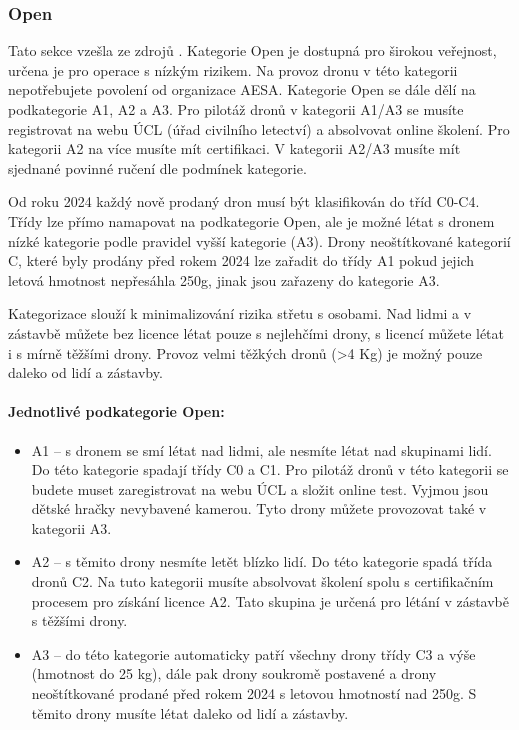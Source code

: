 \subsubsection{Open} 
Tato sekce vzešla ze zdrojů \cite{EASA:openSouhrn2024,AlzaDronyKategorie,DroneKatogorySouhrn}. Kategorie Open je dostupná pro širokou veřejnost, určena je pro operace s nízkým rizikem. Na provoz dronu v této kategorii nepotřebujete povolení od organizace AESA. Kategorie Open se dále dělí na podkategorie A1, A2 a A3. Pro pilotáž dronů v kategorii A1/A3 se musíte registrovat na webu ÚCL (úřad civilního letectví) a absolvovat online školení. Pro kategorii A2 na více musíte mít certifikaci. V kategorii A2/A3 musíte mít sjednané povinné ručení dle podmínek kategorie.


Od roku 2024 každý nově prodaný dron musí být klasifikován do tříd C0-C4. Třídy lze přímo namapovat na podkategorie Open, ale je možné létat s dronem nízké kategorie podle pravidel vyšší kategorie (A3). Drony neoštítkované kategorií C, které byly prodány před rokem 2024 lze zařadit do třídy A1 pokud jejich letová hmotnost nepřesáhla 250g, jinak jsou zařazeny do kategorie A3.

Kategorizace slouží k minimalizování rizika střetu s osobami. Nad lidmi a v zástavbě můžete bez licence létat pouze s nejlehčími drony, s licencí můžete létat i s mírně těžšími drony. Provoz velmi těžkých dronů (>4 Kg) je možný pouze daleko od lidí a zástavby. 

\paragraph{Jednotlivé podkategorie Open:}
\begin{itemize}
    \item A1 -- s dronem se smí létat nad lidmi, ale nesmíte létat nad skupinami lidí. Do této kategorie spadají třídy C0 a C1. Pro pilotáž dronů v této kategorii se budete muset zaregistrovat na webu ÚCL a složit online test. Vyjmou jsou dětské hračky nevybavené kamerou. Tyto drony můžete provozovat také v kategorii A3.

    \item A2 -- s těmito drony nesmíte letět blízko lidí. Do této kategorie spadá třída dronů C2. Na tuto kategorii musíte absolvovat školení spolu s certifikačním procesem pro získání licence A2. Tato skupina je určená pro létání v zástavbě s těžšími drony.
    \item A3 -- do této kategorie automaticky patří všechny drony třídy C3 a výše (hmotnost do 25 kg), dále pak drony soukromě postavené a drony neoštítkované prodané před rokem 2024 s letovou hmotností nad 250g. S těmito drony musíte létat daleko od lidí a zástavby.
\end{itemize}


